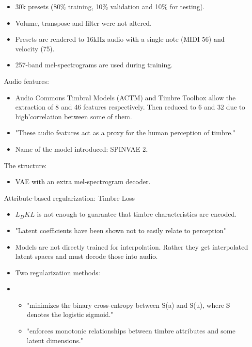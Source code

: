 \begin{itemize}
    \item 30k presets (80\% training, 10\% validation and 10\% for testing). 
    \item Volume, transpose and filter were not altered.
    \item Presets are rendered to 16kHz audio with a single note (MIDI 56) and velocity (75). 
    \item 257-band mel-spectrograms are used during training.
\end{itemize}

Audio features:

\begin{itemize}
    \item Audio Commons Timbral Models (ACTM) and Timbre Toolbox \cite{TimbreToolbox} allow the extraction of 8 and 46 features respectively. Then reduced to 6 and 32 due to high'correlation between some of them.
    \item "These audio features act as a proxy for the human perception of timbre." \cite[p. 4]{latentSpaceInterpolation} 
    \item Name of the model introduced: SPINVAE-2.
\end{itemize}

The structure:

\begin{itemize}
    \item VAE with an extra mel-spectrogram decoder.
\end{itemize}

Attribute-based regularization: Timbre Loss

\begin{itemize}
    \item $L_DKL$ is not enough to guarantee that timbre characteristics are encoded.
    \item "Latent coefficients have been shown not to easily relate to perception"
    \item Models are not directly trained for interpolation. Rather they get interpolated latent spaces and must decode those into audio.
    \item Two regularization methods: 
    \item \begin{itemize}
        \item \cite{Disentanglement} "minimizes the binary cross-entropy between S(a) and S(u), where S denotes the logistic sigmoid."
        \item \cite{Attribute_Based_Regularization} "enforces monotonic relationships between timbre attributes and some latent dimensions."
    \end{itemize} 
\end{itemize}

